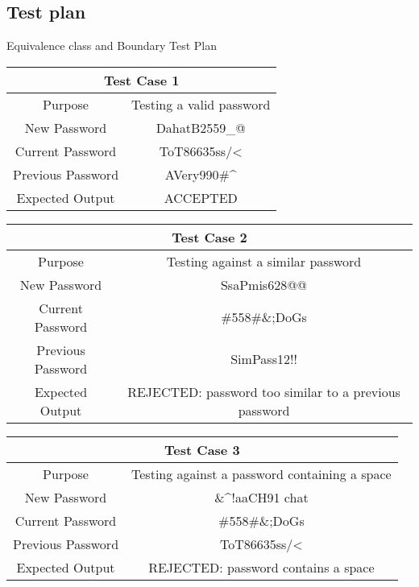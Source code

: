 \documentclass[12pt,letterpaper]{article}
\begin{document}
\subsection{Test plan}

\centering Equivalence class and Boundary Test Plan

\begin{center}
  \begin{tabular}{||c|c||}
  \hline
  \multicolumn{2}{||c||}{Test Case 1} \\
  \hline
  Purpose & Testing a valid password \\
  \hline
  New Password & DahatB2559\_@ \\
  \hline
  Current Password & ToT86635ss/\textless \\
  \hline
  Previous Password & AVery990\#\^{} \\
  \hline
  Expected Output & ACCEPTED \\
  \hline
  \end{tabular}
\end{center}
\vspace{1mm}
\begin{center}
  \begin{tabular}{||c|c||}
  \hline
  \multicolumn{2}{||c||}{Test Case 2} \\
  \hline
  Purpose & Testing against a similar password \\
  \hline
  New Password & SsaPmis628@@ \\
  \hline
  Current Password & \#558\#\&;DoGs \\
  \hline
  Previous Password & SimPass12!! \\
  \hline
  Expected Output & REJECTED: password too similar to a previous password \\
  \hline
  \end{tabular}
\end{center}
\vspace{1mm}
\begin{center}
  \begin{tabular}{||c|c||}
  \hline
  \multicolumn{2}{||c||}{Test Case 3} \\
  \hline
  Purpose & Testing against a password containing a space\\
  \hline
  New Password & \&\^{}!aaCH91 chat \\
  \hline
  Current Password & \#558\#\&;DoGs \\
  \hline
  Previous Password & ToT86635ss/\textless \\
  \hline
  Expected Output & REJECTED: password contains a space \\
  \hline
  \end{tabular}
\end{center}
\end{document}
